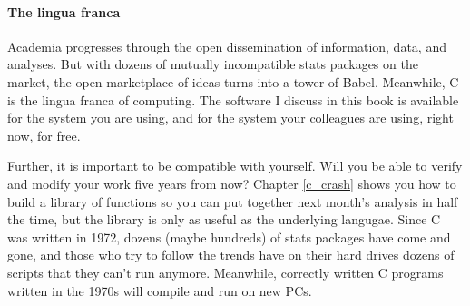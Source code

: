 \paragraph{The lingua franca}
Academia progresses through the open dissemination of information, data,
and analyses. But with dozens of mutually incompatible stats packages
on the market, the open marketplace of ideas turns into a tower of Babel.
Meanwhile, C is the lingua franca of computing. The software I discuss
in this book is available for the system you are using, and for the
system your colleagues are using, right now, for free.

Further, it is important to be compatible with yourself. Will you be
able to verify and modify your work five years from now?  Chapter
\ref{c_crash} shows you how to build a library of functions so you can
put together next month's analysis in half the time, but the library is
only as useful as the underlying langugae.  Since C was written in 1972,
dozens (maybe hundreds) of stats packages have come and gone, and those
who try to follow the trends have on their hard drives dozens of scripts
that they can't run anymore.  Meanwhile, correctly written C programs
written in the 1970s will compile and run on new PCs.  




